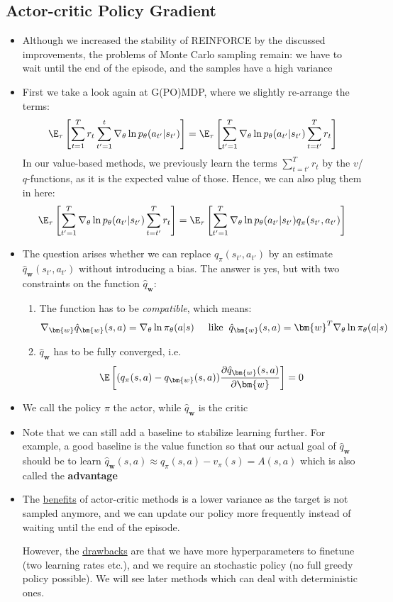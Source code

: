 \subsection{Actor-critic Policy Gradient}
\begin{itemize}
	\item Although we increased the stability of REINFORCE by the discussed improvements, the problems of Monte Carlo sampling remain: we have to wait until the end of the episode, and the samples have a high variance
	\item First we take a look again at G(PO)MDP, where we slightly re-arrange the terms:
	$$\E_{\tau}\left[\sum_{t=1}^{T}  r_t \sum_{t'=1}^{t}\nabla_{\theta} \ln p_{\theta}(a_{t'}|s_{t'}) \right] = \E_{\tau}\left[\sum_{t'=1}^{T}\nabla_{\theta} \ln p_{\theta}(a_{t'}|s_{t'}) \sum_{t=t'}^{T}  r_t\right]$$
	In our value-based methods, we previously learn the terms $\sum_{t=t'}^{T}  r_t$ by the $v$/$q$-functions, as it is the expected value of those. Hence, we can also plug them in here:
	$$\E_{\tau}\left[\sum_{t'=1}^{T}\nabla_{\theta} \ln p_{\theta}(a_{t'}|s_{t'}) \sum_{t=t'}^{T}  r_t\right] = \E_{\tau}\left[\sum_{t'=1}^{T}\nabla_{\theta} \ln p_{\theta}(a_{t'}|s_{t'}) q_{\pi}(s_{t'},a_{t'})\right]$$
	\item The question arises whether we can replace $q_{\pi}(s_{t'},a_{t'})$ by an estimate $\hat{q}_{\bm{w}}(s_{t'},a_{t'})$ without introducing a bias. The answer is yes, but with two constraints on the function $\hat{q}_{\bm{w}}$:
	\begin{enumerate}
		\item The function has to be \textit{compatible}, which means:
		$$\nabla_{\bm{w}}\hat{q}_{\bm{w}}(s,a) = \nabla_{\theta}\ln \pi_{\theta}(a|s)\hspace{5mm}\text{like}\hspace{2mm} \hat{q}_{\bm{w}}(s,a)=\bm{w}^T \nabla_{\theta} \ln \pi_{\theta}(a|s)$$
		\item $\hat{q}_{\bm{w}}$ has to be fully converged, i.e.
		$$\E\left[(q_{\pi}(s,a)-q_{\bm{w}}(s,a)) \frac{\partial \hat{q}_{\bm{w}}(s,a)}{\partial \bm{w}}\right]= 0$$
	\end{enumerate}
	\item We call the policy $\pi$ the actor, while $\hat{q}_{\bm{w}}$ is the critic
	\item Note that we can still add a baseline to stabilize learning further. For example, a good baseline is the value function so that our actual goal of $\hat{q}_{\bm{w}}$ should be to learn $\hat{q}_{\bm{w}}(s,a)\approx q_{\pi}(s,a)-v_{\pi}(s)=A(s,a)$ which is also called the \textbf{advantage}
	\item The \underline{benefits} of actor-critic methods is a lower variance as the target is not sampled anymore, and we can update our policy more frequently instead of waiting until the end of the episode.
	
	However, the \underline{drawbacks} are that we have more hyperparameters to finetune (two learning rates etc.), and we require an stochastic policy (no full greedy policy possible). We will see later methods which can deal with deterministic ones.
\end{itemize}
